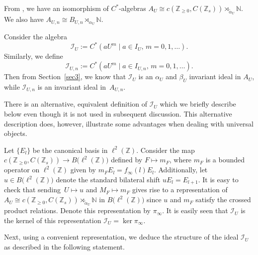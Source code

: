 \documentclass[pdftex]{sigma}
\newcommand{\N}{{\mathbb N}}
\newcommand{\Z}{{\mathbb Z}}
\numberwithin{equation}{section}
\begin{document}
From \cite[Theorem 4.4]{HKMP3}, we have an isomorphism of $C^*$-algebras
$A_U \cong c(\Z_{\ge0}, C(\Z_s))\rtimes_{\tilde{\alpha}_U}\N$.
We also have
$A_{U,n} \cong B_{U,n}\rtimes_{\alpha_U} \N$.

Consider the algebra
\[\mathcal{I}_U := C^*(aU^m \mid a\in I_U,\, m=0,1,\dots).\]
Similarly, we define
\[\mathcal{I}_{U,n} := C^*(aU^m \mid a\in I_{U,n},\, m=0,1,\dots).\]
Then from Section~\ref{sec3}, we know that $\mathcal{I}_U$ is an $\alpha_U$ and $\beta_U$ invariant ideal in $A_U$, while $\mathcal{I}_{U,n}$ is an invariant ideal in~$A_{U,n}$.

There is an alternative, equivalent definition of $\mathcal{I}_U$ which we briefly describe below even though it is not used in subsequent discussion. This alternative description does, however, illustrate some advantages when dealing with universal objects.

Let $\{E_l\}$ be the canonical basis in $\ell^2(\Z)$. Consider the map $c(\Z_{\ge0}, C(\Z_s)) \to B\bigl(\ell^2(\Z)\bigr)$ defined by $F \mapsto m_F$, where $m_F$ is a bounded operator on $\ell^2(\Z)$ given by
$
m_F E_l = f_\infty(l) E_l$.
Additionally, let $u \in B\bigl(\ell^2(\Z)\bigr)$ denote the standard bilateral shift
$
uE_l = E_{l+1}$.
It is easy to check that sending~${U \mapsto u}$ and $M_F \mapsto m_F$ gives rise to a representation of $A_U \cong c(\Z_{\ge0}, C(\Z_s))\rtimes_{\tilde{\alpha}_U}\N$ in $B\bigl(\ell^2(\Z)\bigr)$ since $u$ and $m_F$ satisfy the crossed product relations. Denote this representation by $\pi_\infty$.
It is easily seen that $\mathcal{I}_U$ is the kernel of this representation
$
\mathcal{I}_U = \ker \pi_\infty$.

Next, using a convenient representation, we deduce the structure of the ideal $\mathcal{I}_U$ as described in the following statement.
\end{document}
